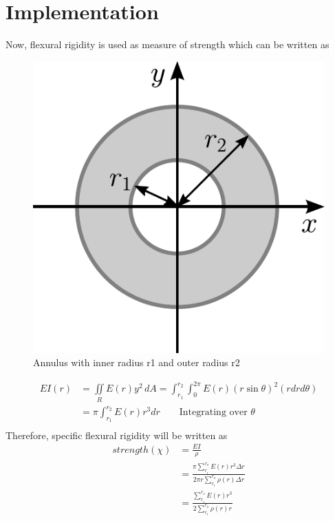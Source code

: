 \documentclass[openright,twoside]{iitkthesis}
\begin{document}
\section{Implementation}
Now, flexural rigidity is used as measure of strength which can be written as 
\begin{figure}
\begin{center}
\includegraphics[scale=0.3]{moment_annulus}
\caption{Annulus with inner radius r1 and outer radius r2}
\end{center}
\end{figure}
\begin{equation}
\begin{split}
EI(r) &= \underset{R}{\iint}E(r)y^2\,dA = \int_{r_1}^{r_2}\int_0^{2\pi} E(r)(r\sin\theta)^2(rdrd\theta)\\
&= \pi\int_{r_1}^{r_2} E(r)r^3 dr \qquad \text{Integrating over $\theta$}\\
\end{split}
\end{equation}
Therefore, specific flexural rigidity will be written as
\begin{equation}\label{objective_eb}
\begin{split}
strength(\chi) &=\frac{EI}{\rho}\\
&=\frac{\pi\sum^{r_o}_{r_i}E(r)r^3\Delta r}{2\pi r\sum^{r_o}_{r_i}\rho(r)\Delta r}\\
&=\frac{\sum^{r_o}_{r_i}E(r)r^3}{2 \sum^{r_o}_{r_i}\rho(r)r}
\end{split}
\end{equation}
\end{document}
